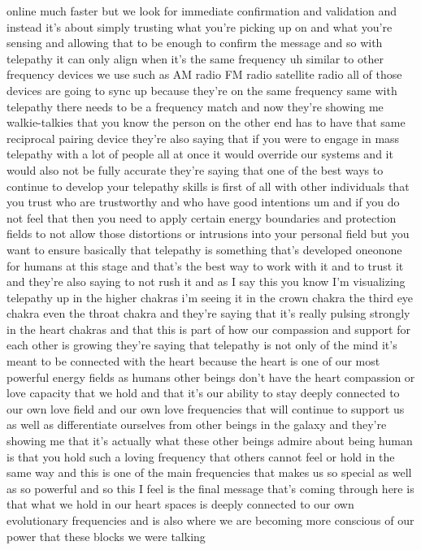 \documentclass{article}
\begin{document}
online much faster but we look for immediate confirmation and validation
and instead it's about simply trusting what you're picking up on and
what you're sensing and allowing that to be enough to confirm the
message and so with telepathy it can only align when it's the same
frequency uh similar to other frequency devices we use such as AM radio
FM radio satellite radio all of those devices are going to sync up
because they're on the same frequency same with telepathy there needs to
be a frequency match and now they're showing me walkie-talkies that you
know the person on the other end has to have that same reciprocal
pairing device they're also saying that if you were to engage in mass
telepathy with a lot of people all at once it would override our systems
and it would also not be fully accurate they're saying that one of the
best ways to continue to develop your telepathy skills is first of all
with other individuals that you trust who are trustworthy and who have
good intentions um and if you do not feel that then you need to apply
certain energy boundaries and protection fields to not allow those
distortions or intrusions into your personal field but you want to
ensure basically that telepathy is something that's developed oneonone
for humans at this stage and that's the best way to work with it and to
trust it and they're also saying to not rush it and as I say this you
know I'm visualizing telepathy up in the higher chakras i'm seeing it in
the crown chakra the third eye chakra even the throat chakra and they're
saying that it's really pulsing strongly in the heart chakras and that
this is part of how our compassion and support for each other is growing
they're saying that telepathy is not only of the mind it's meant to be
connected with the heart because the heart is one of our most powerful
energy fields as humans other beings don't have the heart compassion or
love capacity that we hold and that it's our ability to stay deeply
connected to our own love field and our own love frequencies that will
continue to support us as well as differentiate ourselves from other
beings in the galaxy and they're showing me that it's actually what
these other beings admire about being human is that you hold such a
loving frequency that others cannot feel or hold in the same way and
this is one of the main frequencies that makes us so special as well as
so powerful and so this I feel is the final message that's coming
through here is that what we hold in our heart spaces is deeply
connected to our own evolutionary frequencies and is also where we are
becoming more conscious of our power that these blocks we were talking
\end{document}
